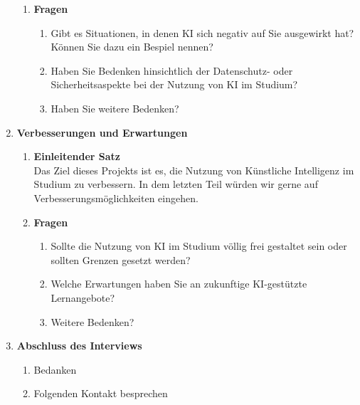 \documentclass[a4paper,12pt]{article}
\begin{document}
\begin{enumerate}
\begin{enumerate}[label=\alph*)]
    \item \textbf{Fragen}
    \begin{enumerate}[label=\roman*)]
        \item  Gibt es Situationen, in denen KI sich negativ auf Sie ausgewirkt hat? Können
        Sie dazu ein Bespiel nennen?

        \item Haben Sie Bedenken hinsichtlich der Datenschutz- oder Sicherheitsaspekte bei
der Nutzung von KI im Studium?

\item  Haben Sie weitere Bedenken?



    \end{enumerate}
\end{enumerate}

\item \textbf{Verbesserungen und Erwartungen}
\begin{enumerate}[label=\alph*)]
    \item \textbf{Einleitender Satz} \\
    Das Ziel dieses Projekts ist es, die Nutzung von Künstliche Intelligenz im Studium zu verbessern. In dem letzten Teil würden wir gerne auf Verbesserungsmöglichkeiten eingehen.
    
    \item \textbf{Fragen}
    \begin{enumerate}[label=\roman*)]
        \item Sollte die Nutzung von KI im Studium völlig frei gestaltet sein oder sollten
Grenzen gesetzt werden?
        \item Welche Erwartungen haben Sie an zukunftige KI-gestützte Lernangebote? 

        \item Weitere Bedenken?


    \end{enumerate}
\end{enumerate}

\item \textbf{Abschluss des Interviews}
\begin{enumerate}[label=\alph*)]
    \item Bedanken
    \item Folgenden Kontakt besprechen
\end{enumerate}

\end{enumerate}


\newpage
\end{document}
